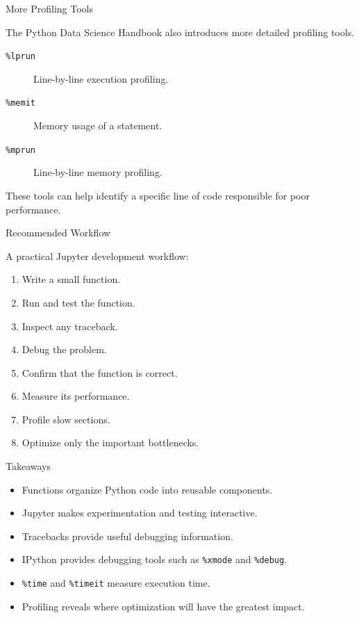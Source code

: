 \documentclass[aspectratio=43]{beamer}
\begin{document}
\begin{frame}{More Profiling Tools}

The Python Data Science Handbook also introduces more detailed profiling tools.

\begin{description}
  \item[\texttt{\%lprun}] Line-by-line execution profiling.
  \item[\texttt{\%memit}] Memory usage of a statement.
  \item[\texttt{\%mprun}] Line-by-line memory profiling.
\end{description}

\vspace{0.4cm}

These tools can help identify a specific line of code responsible for poor performance.

\end{frame}

\begin{frame}{Recommended Workflow}

A practical Jupyter development workflow:

\begin{enumerate}
  \item Write a small function.
  \item Run and test the function.
  \item Inspect any traceback.
  \item Debug the problem.
  \item Confirm that the function is correct.
  \item Measure its performance.
  \item Profile slow sections.
  \item Optimize only the important bottlenecks.
\end{enumerate}

\end{frame}

\begin{frame}{Takeaways}

\begin{itemize}
  \item Functions organize Python code into reusable components.
  \item Jupyter makes experimentation and testing interactive.
  \item Tracebacks provide useful debugging information.
  \item IPython provides debugging tools such as \texttt{\%xmode} and \texttt{\%debug}.
  \item \texttt{\%time} and \texttt{\%timeit} measure execution time.
  \item Profiling reveals where optimization will have the greatest impact.
\end{itemize}

\end{frame}
\end{document}
